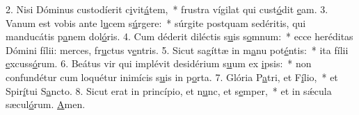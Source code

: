 2. Nisi Dóminus custodíerit c\uline{i}vit\uline{á}tem,~* frustra vígilat qui cust\uline{ó}dit \uline{e}am.
3. Vanum est vobis ante l\uline{u}cem s\uline{ú}rgere:~* súrgite postquam sedéritis, qui manducátis p\uline{a}nem dol\uline{ó}ris.
4. Cum déderit diléctis s\uline{u}is s\uline{o}mnum:~* ecce heréditas Dómini fílii: merces, fr\uline{u}ctus v\uline{e}ntris.
5. Sicut sagíttæ in m\uline{a}nu pot\uline{é}ntis:~* ita fílii \uline{e}xcuss\uline{ó}rum.
6. Beátus vir qui implévit desidérium s\uline{u}um ex \uline{i}psis:~* non confundétur cum loquétur inimícis s\uline{u}is in p\uline{o}rta.
7. Glória P\uline{a}tri, et F\uline{í}lio,~* et Spir\uline{í}tui S\uline{a}ncto.
8. Sicut erat in princípio, et n\uline{u}nc, et s\uline{e}mper,~* et in sǽcula sæcul\uline{ó}rum. \uline{A}men.
